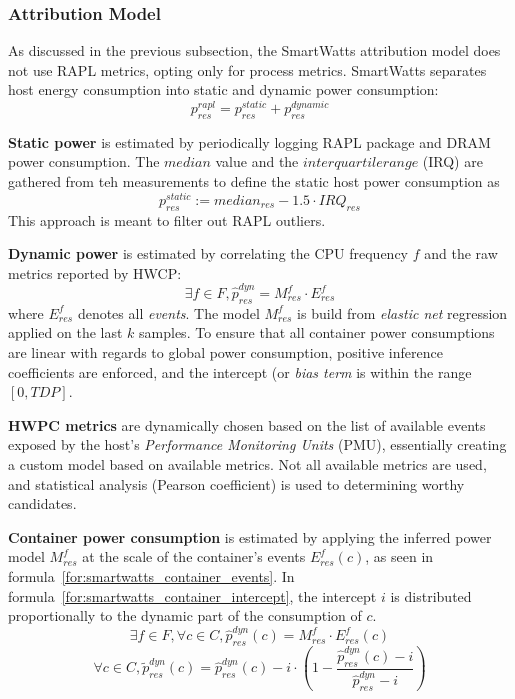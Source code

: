 \subsubsection{Attribution Model}
\label{sec:smartwatts-attribution}
As discussed in the previous subsection, the SmartWatts attribution model does not use RAPL metrics, opting only for process metrics. SmartWatts separates host energy consumption into static and dynamic power consumption:
\begin{equation}
    p_{res}^{rapl} = p_{res}^{static} + p_{res}^{dynamic}
\end{equation}

\textbf{Static power} is estimated by periodically logging RAPL package and DRAM power consumption. The $median$ value and the $interquartile range$ (IRQ) are gathered from teh measurements to define the static host power consumption as 
\begin{equation}
    p_{res}^{static} := median_{res} - 1.5 \cdot IRQ_{res}
\end{equation}
This approach is meant to filter out RAPL outliers.

\textbf{Dynamic power} is estimated by correlating the CPU frequency $f$ and the raw metrics reported by HWCP:
\begin{equation}
    \exists f \in F, \hat{p}_{res}^{dyn} = M_{res}^{f} \cdot E_{res}^{f}
\end{equation}
where $E_{res}^{f}$ denotes all \textit{events}. The model $M_{res}^{f}$ is build from \textit{elastic net} regression applied on the last $k$ samples. To ensure that all container power consumptions are linear with regards to global power consumption, positive inference coefficients are enforced, and the intercept (or \textit{bias term} is within the range $[0, TDP]$.

\textbf{HWPC metrics} are dynamically chosen based on the list of available events exposed by the host's \textit{Performance Monitoring Units} (PMU), essentially creating a custom model based on available metrics. Not all available metrics are used, and statistical analysis (Pearson coefficient) is used to determining worthy candidates.

\textbf{Container power consumption} is estimated by applying the inferred power model $M_{res}^{f}$ at the scale of the container's events $E_{res}^{f}(c)$, as seen in formula~\ref{for:smartwatts_container_events}. In formula~\ref{for:smartwatts_container_intercept}, the intercept $i$ is distributed proportionally to the dynamic part of the consumption of $c$.
\begin{equation}
\label{for:smartwatts_container_events}
    \exists f \in F, \forall c \in C, \hat{p}_{res}^{dyn}(c) = M_{res}^{f} \cdot E_{res}^{f}(c)
\end{equation}
\begin{equation}
\label{for:smartwatts_container_intercept}
    \forall c \in C, \tilde{p}_{res}^{dyn}(c) = \hat{p}_{res}^{dyn}(c) - i \cdot (1-\frac{\hat{p}_{res}^{dyn}(c) -i}{\hat{p}_{res}^{dyn} -i})
\end{equation}

